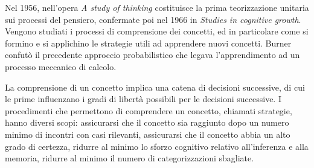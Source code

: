 Nel 1956, nell’opera \emph{A study of thinking} costituisce la prima teorizzazione unitaria sui processi del pensiero, confermate poi nel 1966 in \emph{Studies in cognitive growth}. Vengono studiati i processi di comprensione dei concetti, ed in particolare come si formino e si applichino le strategie utili ad apprendere nuovi concetti. Burner confutò il precedente approccio probabilistico che legava l’apprendimento ad un processo meccanico di calcolo.

La comprensione di un concetto implica una catena di decisioni successive, di cui le prime influenzano i gradi di libertà possibili per le decisioni successive. I procedimenti che permettono di comprendere un concetto, chiamati strategie, hanno diversi scopi: assicurarsi che il concetto sia raggiunto dopo un numero minimo di incontri con casi rilevanti, assicurarsi che il concetto abbia un alto grado di certezza, ridurre al minimo lo sforzo cognitivo relativo all’inferenza e alla memoria, ridurre al minimo il numero di categorizzazioni sbagliate.
